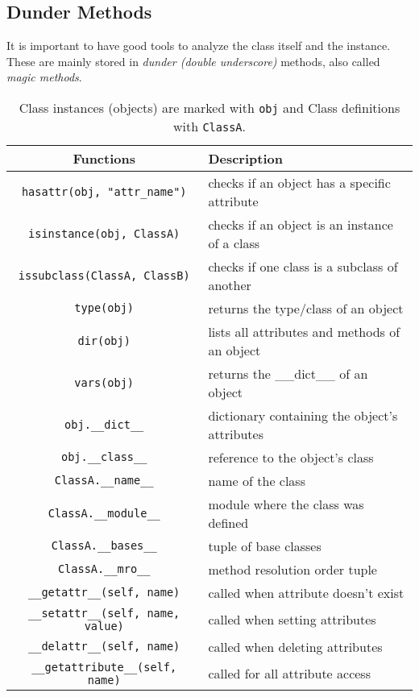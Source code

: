 \subsection{Dunder Methods}

  It is important to have good tools to analyze the class itself and the instance. These are mainly stored in \textit{dunder (double underscore)} methods, also called \textit{magic methods}. 

  \begin{definition}
    \begin{table}[H]
      \centering
      \begin{tabular}{|c|p{8cm}|}
        \hline
        \textbf{Functions} & \textbf{Description} \\
        \hline 
        \texttt{hasattr(obj, "attr\_name")} & checks if an object has a specific attribute \\
        \hline
        \texttt{isinstance(obj, ClassA)} & checks if an object is an instance of a class \\
        \hline
        \texttt{issubclass(ClassA, ClassB)} & checks if one class is a subclass of another \\
        \hline
        \texttt{type(obj)} & returns the type/class of an object \\
        \hline
        \texttt{dir(obj)} & lists all attributes and methods of an object \\
        \hline
        \texttt{vars(obj)} & returns the \_\_dict\_\_ of an object \\
        \hline
        \texttt{obj.\_\_dict\_\_} & dictionary containing the object's attributes \\
        \hline
        \texttt{obj.\_\_class\_\_} & reference to the object's class \\
        \hline
        \texttt{ClassA.\_\_name\_\_} & name of the class \\
        \hline
        \texttt{ClassA.\_\_module\_\_} & module where the class was defined \\
        \hline
        \texttt{ClassA.\_\_bases\_\_} & tuple of base classes \\
        \hline
        \texttt{ClassA.\_\_mro\_\_} & method resolution order tuple \\
        \hline
        \texttt{\_\_getattr\_\_(self, name)} & called when attribute doesn't exist \\
        \hline
        \texttt{\_\_setattr\_\_(self, name, value)} & called when setting attributes \\
        \hline
        \texttt{\_\_delattr\_\_(self, name)} & called when deleting attributes \\
        \hline
        \texttt{\_\_getattribute\_\_(self, name)} & called for all attribute access \\
        \hline
      \end{tabular}
      \caption{Class instances (objects) are marked with \texttt{obj} and Class definitions with \texttt{ClassA}.}
      \label{tab:functions_for_classes}
    \end{table}
  \end{definition}

